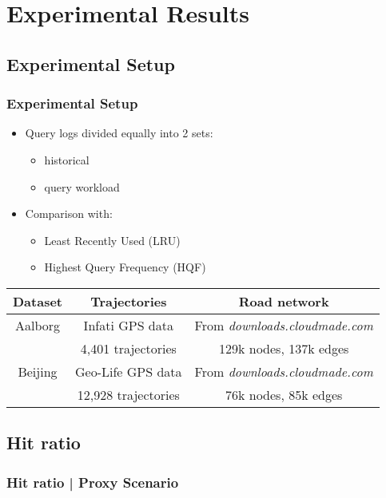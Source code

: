 \section{Experimental Results}


\subsection{Experimental Setup}
\begin{frame}[red] %
\frametitle{Experimental Setup} 
\begin{itemize}
\item Query logs divided equally into 2 sets: 
  \begin{itemize}
    \item historical
    \item query workload
  \end{itemize}
\item Comparison with:
  \begin{itemize}
    \item Least Recently Used (LRU)
    \item Highest Query Frequency (HQF)
  \end{itemize}  
\end{itemize}

\begin{tabular}{c|cc}\hline
Dataset & Trajectories & Road network \\ \hline \hline
Aalborg & Infati GPS data &  From {\em downloads.cloudmade.com} \\
        & 4,401 trajectories  & 129k nodes, 137k edges \\\hline
Beijing & Geo-Life GPS data & From {\em downloads.cloudmade.com} \\
        & 12,928 trajectories & 76k nodes,  85k edges \\\hline
\end{tabular}


\end{frame}


\subsection{Hit ratio}
\begin{frame}[plain]%
\frametitle{Hit ratio | Proxy Scenario} 


\end{frame}


